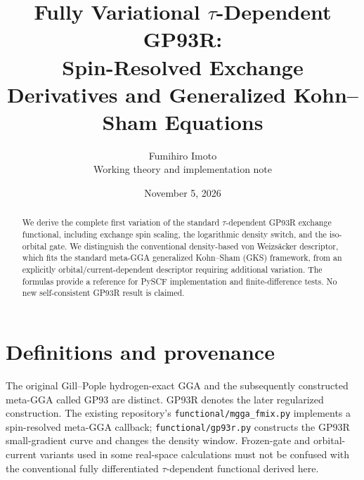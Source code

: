 \documentclass[11pt,a4paper]{article}
\title{Fully Variational $\tau$-Dependent GP93R:\\Spin-Resolved Exchange Derivatives and Generalized Kohn--Sham Equations}
\author{Fumihiro Imoto\\Working theory and implementation note}
\date{November 5, 2026}
\begin{document}
\maketitle
\begin{abstract}
We derive the complete first variation of the standard $\tau$-dependent GP93R exchange functional, including exchange spin scaling, the logarithmic density switch, and the iso-orbital gate. We distinguish the conventional density-based von Weizs\"acker descriptor, which fits the standard meta-GGA generalized Kohn--Sham (GKS) framework, from an explicitly orbital/current-dependent descriptor requiring additional variation. The formulas provide a reference for PySCF implementation and finite-difference tests. No new self-consistent GP93R result is claimed.
\end{abstract}
\tableofcontents
\section{Definitions and provenance}
The original Gill--Pople hydrogen-exact GGA and the subsequently constructed meta-GGA called GP93 are distinct. GP93R denotes the later regularized construction. The existing repository's \texttt{functional/mgga\_fmix.py} implements a spin-resolved meta-GGA callback; \texttt{functional/gp93r.py} constructs the GP93R small-gradient curve and changes the density window. Frozen-gate and orbital-current variants used in some real-space calculations must not be confused with the conventional fully differentiated $\tau$-dependent functional derived here.
\end{document}
